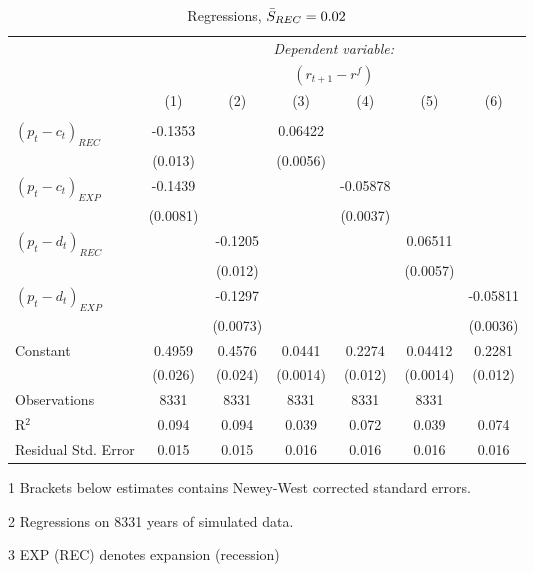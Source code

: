 \begin{table}[H]
\centering   
  \caption{Regressions, $\Bar{S}_{REC} = 0.02$}           
  \label{tab:regress2}     
  \begin{threeparttable}
\begin{tabular}{@{\hspace{5pt}}l@{\hspace{5pt}}cccccc} 
\toprule 
 & \multicolumn{6}{c}{\textit{Dependent variable:}} \\ 
 & \multicolumn{6}{c}{$\left(r_{t+1}-r^f\right)$} \\ 
 \cmidrule(rr){2-7}
 & (1) & (2) & (3) & (4) & (5) & (6) \\ 
\midrule  
\\[-2.1ex] $\left( p_t - c_t \right)_{REC}$ &-0.1353& &0.06422 & & &\\ 
  & (0.013) & &(0.0056) & & & \\ 
 \addlinespace 
  $\left( p_t - c_t \right)_{EXP}$ &-0.1439  &    & &-0.05878 & &  \\ 
  & (0.0081) & & &(0.0037) & & \\ 
 \addlinespace 
  $\left( p_t - d_t \right)_{REC}$ & &-0.1205& & & 0.06511  &   \\ 
                                   & &  (0.012) & & & (0.0057) &    \\ 
 \addlinespace 
  $\left( p_t - d_t \right)_{EXP}$ & &   -0.1297& & & &-0.05811 \\ 
                                   & &  (0.0073) & & & &(0.0036) \\ 
 \addlinespace 
 Constant &0.4959 &0.4576&0.0441 &0.2274 &0.04412 &0.2281 \\ 
          &(0.026) &(0.024)&(0.0014)&(0.012)&(0.0014)&(0.012) \\ 
 \addlinespace 
\midrule  
Observations & 8331 & 8331& 8331&8331&8331\\
R$^{2}$ &0.094 & 0.094&0.039&0.072&0.039&0.074 \\ 
Residual Std. Error &0.015 & 0.015&0.016&0.016&0.016&0.016 \\ 
\bottomrule 
\end{tabular} 
\begin{tablenotes}
\footnotesize{
\item[1] Brackets below estimates contains Newey-West corrected standard errors. 
\item[2] Regressions on 8331 years of simulated data.
\item[3] EXP (REC) denotes expansion (recession)
}
\end{tablenotes}
\end{threeparttable}
\end{table} 
